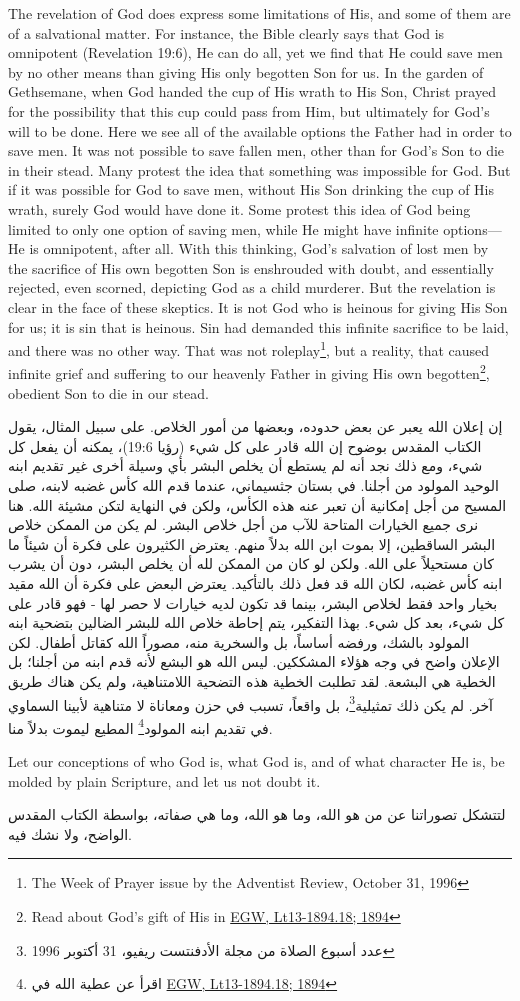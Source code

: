 The revelation of God does express some limitations of His, and some of them are of a salvational matter. For instance, the Bible clearly says that God is omnipotent (Revelation 19:6), He can do all, yet we find that He could save men by no other means than giving His only begotten Son for us. In the garden of Gethsemane, when God handed the cup of His wrath to His Son, Christ prayed for the possibility that this cup could pass from Him, but ultimately for God's will to be done. Here we see all of the available options the Father had in order to save men. It was not possible to save fallen men, other than for God’s Son to die in their stead. Many protest the idea that something was impossible for God. But if it was possible for God to save men, without His Son drinking the cup of His wrath, surely God would have done it. Some protest this idea of God being limited to only one option of saving men, while He might have infinite options—He is omnipotent, after all. With this thinking, God’s salvation of lost men by the sacrifice of His own begotten Son is enshrouded with doubt, and essentially rejected, even scorned, depicting God as a child murderer. But the revelation is clear in the face of these skeptics. It is not God who is heinous for giving His Son for us; it is sin that is heinous. Sin had demanded this infinite sacrifice to be laid, and there was no other way. That was not roleplay\footnote{The Week of Prayer issue by the Adventist Review, October 31, 1996}, but a reality, that caused infinite grief and suffering to our heavenly Father in giving His own begotten\footnote{Read about God’s gift of His  in \href{https://egwwritings.org/?ref=en_Lt13-1894.18&para=5486.24}{{EGW, Lt13-1894.18; 1894}}}, obedient Son to die in our stead.


إن إعلان الله يعبر عن بعض حدوده، وبعضها من أمور الخلاص. على سبيل المثال، يقول الكتاب المقدس بوضوح إن الله قادر على كل شيء (رؤيا 19:6)، يمكنه أن يفعل كل شيء، ومع ذلك نجد أنه لم يستطع أن يخلص البشر بأي وسيلة أخرى غير تقديم ابنه الوحيد المولود من أجلنا. في بستان جثسيماني، عندما قدم الله كأس غضبه لابنه، صلى المسيح من أجل إمكانية أن تعبر عنه هذه الكأس، ولكن في النهاية لتكن مشيئة الله. هنا نرى جميع الخيارات المتاحة للآب من أجل خلاص البشر. لم يكن من الممكن خلاص البشر الساقطين، إلا بموت ابن الله بدلاً منهم. يعترض الكثيرون على فكرة أن شيئاً ما كان مستحيلاً على الله. ولكن لو كان من الممكن لله أن يخلص البشر، دون أن يشرب ابنه كأس غضبه، لكان الله قد فعل ذلك بالتأكيد. يعترض البعض على فكرة أن الله مقيد بخيار واحد فقط لخلاص البشر، بينما قد تكون لديه خيارات لا حصر لها - فهو قادر على كل شيء، بعد كل شيء. بهذا التفكير، يتم إحاطة خلاص الله للبشر الضالين بتضحية ابنه المولود بالشك، ورفضه أساساً، بل والسخرية منه، مصوراً الله كقاتل أطفال. لكن الإعلان واضح في وجه هؤلاء المشككين. ليس الله هو البشع لأنه قدم ابنه من أجلنا؛ بل الخطية هي البشعة. لقد تطلبت الخطية هذه التضحية اللامتناهية، ولم يكن هناك طريق آخر. لم يكن ذلك تمثيلية\footnote{عدد أسبوع الصلاة من مجلة الأدفنتست ريفيو، 31 أكتوبر 1996}، بل واقعاً، تسبب في حزن ومعاناة لا متناهية لأبينا السماوي في تقديم ابنه المولود\footnote{اقرأ عن عطية الله  في \href{https://egwwritings.org/?ref=en_Lt13-1894.18&para=5486.24}{{EGW, Lt13-1894.18; 1894}}} المطيع ليموت بدلاً منا.


Let our conceptions of who God is, what God is, and of what character He is, be molded by plain Scripture, and let us not doubt it.


لتتشكل تصوراتنا عن من هو الله، وما هو الله، وما هي صفاته، بواسطة الكتاب المقدس الواضح، ولا نشك فيه.


